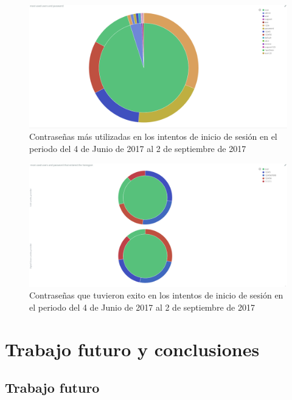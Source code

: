   \begin{figure}
    \centering
      \includegraphics[scale=0.3]{images/ElasticPiePasswors}
    \caption{Contraseñas más utilizadas en los intentos de inicio de sesión en el periodo del 4 de Junio de 2017 al 2 de septiembre de 2017}
    \label{fig:data-pie-passwords}
  \end{figure}

  \begin{figure}
    \centering
      \includegraphics[scale=0.3]{images/ElasticPiePasswordSuccessful}
    \caption{Contraseñas que tuvieron exito en los intentos de inicio de sesión en el periodo del 4 de Junio de 2017 al 2 de septiembre de 2017}
    \label{fig:data-pie-passwords-successful}
  \end{figure}
  
  
  
\chapter{Trabajo futuro y conclusiones}
\section{Trabajo futuro}
\label{sec:trabajo-futuro}

